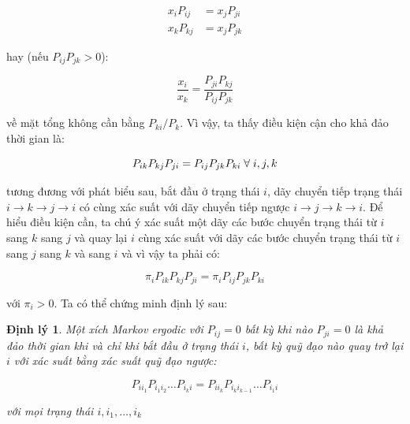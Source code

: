 \documentclass[14pt, a4paper]{article}
\numberwithin{equation}{section}
\numberwithin{figure}{section}
\newtheorem{dl}{Định lý}
\theoremstyle{sltheorem}
\theoremstyle{soltheorem}
\numberwithin{dl}{section}
\numberwithin{md}{section}
\numberwithin{vd}{section}
\begin{document}
    \begin{equation*}
        \begin{aligned}
            x_i P_{ij} &= x_j P_{ji} \\
            x_k P_{kj} &= x_j P_{jk}
        \end{aligned}
    \end{equation*}

    hay (nếu $P_{ij} P_{jk} > 0$):

    \begin{equation*}
        \dfrac{x_i}{x_k} = \dfrac{P_{ji}P_{kj}}{P_{ij}P_{jk}}
    \end{equation*}

    về mặt tổng không cần bằng $P_{ki}/P_{k}$.
    Vì vậy, ta thấy điều kiện cận cho khả đảo thời gian là:

    \begin{equation} \label{eq:4.25}
        P_{ik} P_{kj} P_{ji} = P_{ij} P_{jk} P_{ki} \thickspace \forall \thickspace i, j, k
    \end{equation}

    tương đương với phát biểu sau, bắt đầu ở trạng thái $i$, dãy chuyển tiếp trạng thái $i \rightarrow k \rightarrow j \rightarrow i$ có cùng xác suất với dãy chuyển tiếp ngược $i \rightarrow j \rightarrow k \rightarrow i$.
    Để hiểu điều kiện cần, ta chú ý xác suất một dãy các bước chuyển trạng thái từ $i$ sang $k$ sang $j$ và quay lại $i$ cùng xác suất với dãy các bước chuyển trạng thái từ $i$ sang $j$ sang $k$ và sang $i$ và vì vậy ta phải có:

    \begin{equation*}
        \pi_i P_{ik} P_{kj} P_{ji} = \pi_i P_{ij} P_{jk} P_{ki}
    \end{equation*}

    với $\pi_i > 0$. Ta có thể chứng minh định lý sau:

    \begin{dl} \label{dl:4.2}
        Một xích Markov ergodic với $P_{ij}=0$ bất kỳ khi nào $P_{ji}=0$ là khả đảo thời gian khi và chỉ khi bắt đầu ở trạng thái $i$, bất kỳ quỹ đạo nào quay trở lại $i$ với xác suất bằng xác suất quỹ đạo ngược:

        \begin{equation} \label{eq:4.26}
            P_{ii_1} P_{i_1 i_2} \dots P_{i_k i} = P_{i i_k} P_{i_k i_{k-1}} \dots P_{i_1 i}
        \end{equation}

        với mọi trạng thái $i, i_1, \dots, i_k$
    \end{dl}
\end{document}
